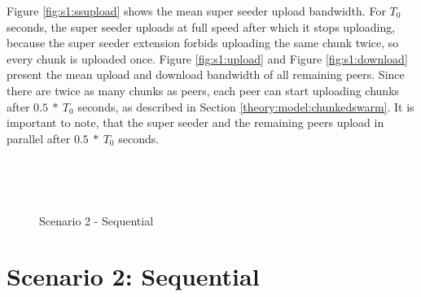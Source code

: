 Figure \ref{fig:s1:ssupload} shows the mean super seeder upload bandwidth. For $T_0$ seconds, the super seeder uploads at full speed after which it stops uploading, because the super seeder extension forbids uploading the same chunk twice, so every chunk is uploaded once. Figure \ref{fig:s1:upload} and Figure \ref{fig:s1:download} present the mean upload and download bandwidth of all remaining peers. Since there are twice as many chunks as peers, each peer can start uploading chunks after $0.5\:*\:T_0$ seconds, as described in Section \ref{theory:model:chunkedswarm}. It is important to note, that the super seeder and the remaining peers upload in parallel after $0.5\:*\:T_0$ seconds.



\begin{figure}[ht]
	\begin{center}
		~ %

		~ %

		\caption{Scenario 2 - Sequential}
		\label{fig:s2}
	\end{center}
\end{figure}

\pagebreak
\section{Scenario 2: Sequential}
\label{evaluation:2}


